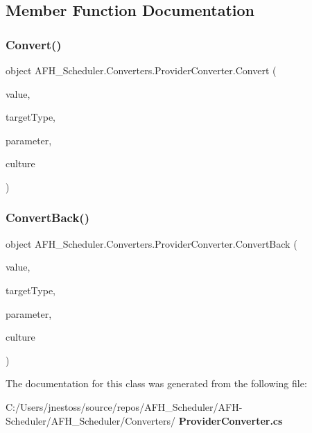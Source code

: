 \subsection{Member Function Documentation}
\mbox{\label{class_a_f_h___scheduler_1_1_converters_1_1_provider_converter_a85e23aa8d94089b37689e43c1092d729}} 
\subsubsection{Convert()}
{\footnotesize\ttfamily object A\+F\+H\+\_\+\+Scheduler.\+Converters.\+Provider\+Converter.\+Convert (\begin{DoxyParamCaption}\item[{object}]{value,  }\item[{Type}]{target\+Type,  }\item[{object}]{parameter,  }\item[{Culture\+Info}]{culture }\end{DoxyParamCaption})}

\mbox{\label{class_a_f_h___scheduler_1_1_converters_1_1_provider_converter_a18741bb5c7b1d2629de5ed08f85eb5dd}} 
\subsubsection{ConvertBack()}
{\footnotesize\ttfamily object A\+F\+H\+\_\+\+Scheduler.\+Converters.\+Provider\+Converter.\+Convert\+Back (\begin{DoxyParamCaption}\item[{object}]{value,  }\item[{Type}]{target\+Type,  }\item[{object}]{parameter,  }\item[{Culture\+Info}]{culture }\end{DoxyParamCaption})}



The documentation for this class was generated from the following file\+:\begin{DoxyCompactItemize}
\item 
C\+:/\+Users/jnestoss/source/repos/\+A\+F\+H\+\_\+\+Scheduler/\+A\+F\+H-\/\+Scheduler/\+A\+F\+H\+\_\+\+Scheduler/\+Converters/\textbf{ Provider\+Converter.\+cs}\end{DoxyCompactItemize}
